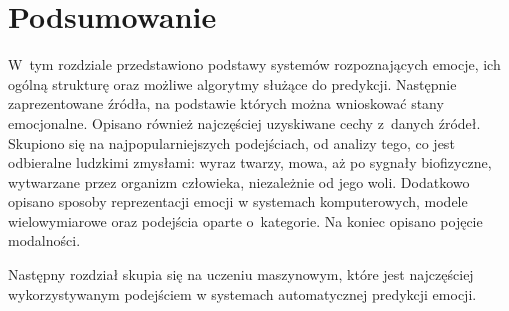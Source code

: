 \section{Podsumowanie}\label{sec:podsumowanie}

W~tym rozdziale przedstawiono podstawy systemów rozpoznających emocje, ich ogólną strukturę oraz możliwe algorytmy służące do predykcji.
Następnie zaprezentowane źródła, na podstawie których można wnioskować stany emocjonalne.
Opisano również najczęściej uzyskiwane cechy z~danych źródeł.
Skupiono się na najpopularniejszych podejściach, od analizy tego, co jest odbieralne ludzkimi zmysłami: wyraz twarzy, mowa, aż po sygnały biofizyczne, wytwarzane przez organizm człowieka, niezależnie od jego woli.
Dodatkowo opisano sposoby reprezentacji emocji w systemach komputerowych, modele wielowymiarowe oraz podejścia oparte o~kategorie.
Na koniec opisano pojęcie modalności.

Następny rozdział skupia się na uczeniu maszynowym, które jest najczęściej wykorzystywanym podejściem w systemach automatycznej predykcji emocji.
